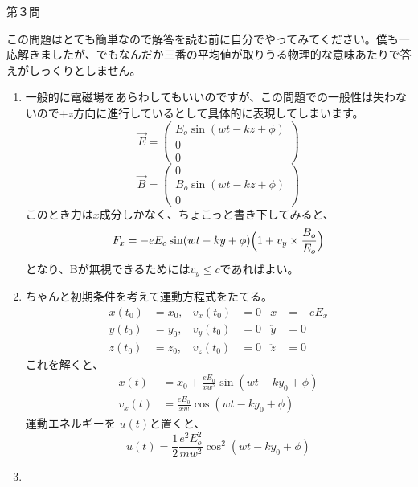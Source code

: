 \documentclass[fleqn]{jbook}
\begin{document}
\begin{answer}{第３問}{}

この問題はとても簡単なので解答を読む前に自分でやってみてください。僕も一応解きましたが、でもなんだか三番の平均値が取りうる物理的な意味あたりで答えがしっくりとしません。

\begin{enumerate}
\item

\vspace*{2zw}

一般的に電磁場をあらわしてもいいのですが、この問題での一般性は失わないので$+z$方向に進行しているとして具体的に表現してしまいます。
\begin{equation}
\overrightarrow{E}=\begin{pmatrix}
E_{o}\sin(wt-kz+\phi)\\
0\\
0
\end{pmatrix}
\end{equation}
\begin{equation}
\overrightarrow{B}=\begin{pmatrix}
0 \\
B_{o}\sin(wt-kz+\phi)\\
0
\end{pmatrix}
\end{equation}
このとき力は$x$成分しかなく、ちょこっと書き下してみると、\\
\begin{equation}
F_x=-eE_{o}\sin(wt-ky+\phi) \Bigl(1+v_y\times \frac{B_{o}}{E_{o}} \Bigr) 
\end{equation}
となり、Bが無視できるためには$v_y \leqslant c$であればよい。
\item
ちゃんと初期条件を考えて運動方程式をたてる。
\begin{align}
x(t_{0}) &= x_{0}, & v_{x}(t_0) &= 0 & \ddot{x} &= -eE_{x} \\
y(t_{0}) &= y_{0}, & v_{y}(t_0) &= 0 & \ddot{y} &= 0 \\
z(t_{0}) &= z_{0}, & v_{z}(t_0) &= 0 & \ddot{z} &= 0 
\end{align}
これを解くと、\\
\begin{align}
x(t) &= x_{0} + \frac{eE_{0}}{xw^{2}}\sin(wt-ky_0+\phi) \\
v_{x}(t) &=\frac{eE_{0}}{xw}\cos(wt-ky_0+\phi) 
\end{align}
運動エネルギーを $u(t)$と置くと、
\begin{equation}
u(t)=\frac{1}{2}\frac{e^{2}E_{o}^{2}}{mw^{2}}\cos^{2}(wt-ky_{0}+\phi)
\end{equation}
\item


\end{enumerate}
\end{answer}
\end{document}
